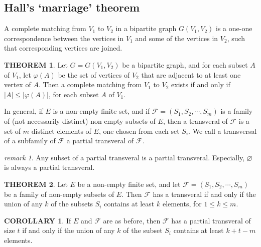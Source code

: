 \documentclass[a4paper,11pt]{article}%
\theoremstyle{remark}
\newtheorem*{remark}{remark}
\theoremstyle{definition}
\newtheorem{theorem}{THEOREM}[section]
\theoremstyle{definition}
\newtheorem{corollary}{COROLLARY}[section]
\theoremstyle{definition}
\theoremstyle{definition}
\theoremstyle{plain}
\newcommand*{\abs}[1]{\lvert #1 \rvert}
\theoremstyle{definition}
\begin{document}
\subsection{Hall's `marriage' theorem}
A complete matching from $V_1$ to $V_2$ in a bipartite graph $G(V_1,V_2)$
is a one-one correspondence between the vertices in $V_1$ and some of the vertices in $V_2$, such that corresponding vertices are joined.
\begin{theorem}
    Let $G=G(V_1,V_2)$ be a bipartite graph, and for each subset $A$ of $V_1$,
    let $\varphi(A)$ be the set of vertices of $V_2$ that are adjacent to at least one vertex of $A$. Then a complete matching from $V_1$ 
    to $V_2$ exists if and only if $\abs{A}\leq\abs{\varphi(A)}$, for each subset $A$ of $V_1.$
\end{theorem}
In general, if $E$ is a non-empty finite set, and if $\mathcal{F} =(S_1,S_2,\cdots,S_m)$ is a family of (not necessarily distinct)
non-empty subsets of $E$, then a transveral of $\mathcal{F}$ is a set of $m$ distinct elements of $E$, one chosen from each set $S_i$.
We call a transversal of a subfamily of $\mathcal{F}$ a partial transveral of $\mathcal{F}$.
\begin{remark}
    Any subset of a partial transveral is a partial transveral. Especially, $\varnothing$ is always a partial transveral.
\end{remark}
\begin{theorem}
    Let $E$ be a non-empty finite set, and let $\mathcal{F}=(S_1,S_2,\cdots,S_m)$ be a family of non-empty subsets of $E$.
    Then $\mathcal{F}$ has a transveral if and only if the union of any $k$ of the subsets $S_i$ contains at least $k$ elements, for $1\leq k\leq m$.
\end{theorem}
\begin{corollary}
    If $E$ and $\mathcal{F}$ are as before, then $\mathcal{F}$ has a partial transveral of size $t$ if and only if the union of any $k$
    of the subset $S_i$ contains at least $k+t-m$ elements.
\end{corollary}
\end{document}
